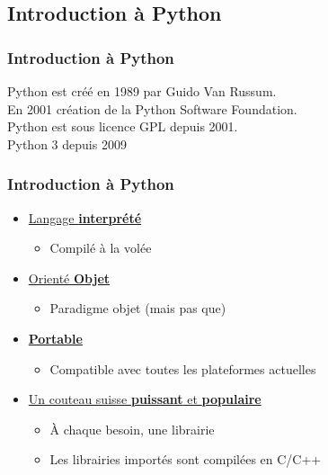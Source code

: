 \subsection{Introduction à Python}

\begin{frame}
  \frametitle{Introduction à Python}
  Python est créé en 1989 par Guido Van Russum. \\
  En 2001 création de la Python Software Foundation. \\
  Python est sous licence GPL depuis 2001. \\
  Python 3 depuis 2009
\end{frame}

\begin{frame}
  \frametitle{Introduction à Python}
  \begin{itemize}
  \item \underline{Langage \textbf{interprété}}
    \begin{itemize}
    \item Compilé à la volée
    \end{itemize}
  \item \underline{Orienté \textbf{Objet}}
    \begin{itemize}
    \item Paradigme objet (mais pas que)
    \end{itemize}
  \item \underline{\textbf{Portable}}
    \begin{itemize}
    \item Compatible  avec toutes les plateformes actuelles
    \end{itemize}
  \item \underline{Un couteau suisse \textbf{puissant} et \textbf{populaire}}
    \begin{itemize}
    \item À chaque besoin, une librairie
    \item Les librairies importés sont compilées en C/C++
    \end{itemize}
  \end{itemize}
\end{frame}

